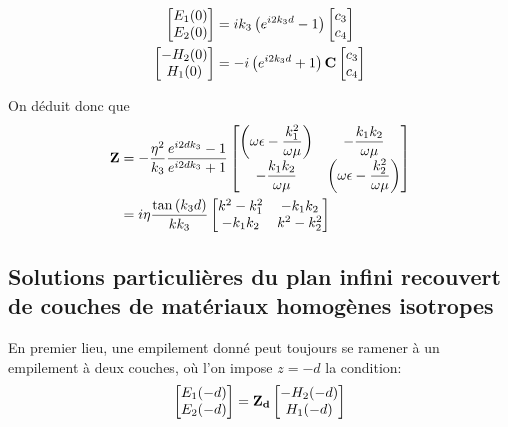 \begin{align}
    \begin{bmatrix}
        E_1(0)\\
        E_2(0)\\
    \end{bmatrix}
    &=ik_3\left( e^{i2k_3 d} -1 \right)
    \begin{bmatrix}
        c_3 \\
        c_4
    \end{bmatrix} \\
    \begin{bmatrix}
        -H_2(0)\\
        H_1(0)\\
    \end{bmatrix}
    & = - i\left(e^{i2k_3 d} +1 \right)
    \mathbf{C}
    \begin{bmatrix}
    c_3 \\
    c_4
    \end{bmatrix}
\end{align}

On déduit donc que
\begin{align}
    \mathbf{Z} &=  - \dfrac{\eta^2}{k_3}\dfrac{e^{i2dk_3} -1}{e^{i2dk_3} +1}  
        \begin{bmatrix}
           \left(\omega\epsilon-\dfrac{k_1^2}{\omega\mu}\right)  & -\dfrac{k_1k_2}{\omega\mu}\\
            -\dfrac{k_1k_2}{\omega\mu} &  \left(\omega\epsilon-\dfrac{k_2^2}{\omega\mu}\right)
        \end{bmatrix}\\
    &= i\eta\dfrac{\tan\left(k_3d\right)}{kk_3}
        \begin{bmatrix}
           k^2-k_1^2  & -k_1k_2\\
            -k_1k_2 & k^2-k_2^2\\
        \end{bmatrix}
\end{align}


\subsection{Solutions particulières du plan infini recouvert de couches de matériaux homogènes isotropes}

En premier lieu, une empilement donné peut toujours se ramener à un empilement à deux couches, où l'on impose $z=-d$ la condition:
\begin{equation}
    \begin{bmatrix}
        E_1(-d)\\
        E_2(-d)\\
    \end{bmatrix}
    =
    \mathbf{Z_{d}} 
    \begin{bmatrix}
        -H_2(-d)\\
        H_1(-d)\\
    \end{bmatrix}
\end{equation}

